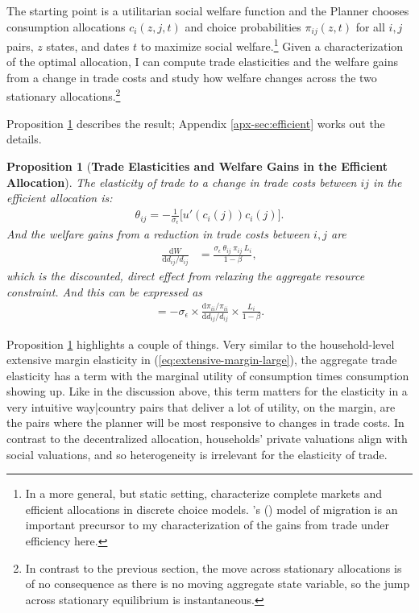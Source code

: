 \documentclass[12pt,pdftex]{article}
\newtheorem{prp}{Proposition}
\def\citeapos#1{\citeauthor{#1}'s (\citeyear{#1})}
\begin{document}
\begin{onehalfspacing}
The starting point is a utilitarian social welfare function and the Planner chooses consumption allocations $c_{i}(z, j, t)$ and choice probabilities $\pi_{ij}(z,t)$ for all $i,j$ pairs, $z$ states, and dates $t$ to maximize social welfare.\footnote{In a more general, but static setting, \citet{mongey-waugh-2} characterize complete markets and efficient allocations in discrete choice models. \citeapos{lagakos2023welfare} model of migration is an important precursor to my characterization of the gains from trade under efficiency here.} Given a characterization of the optimal allocation, I can compute trade elasticities and the welfare gains from a change in trade costs and study how welfare changes across the two stationary allocations.\footnote{In contrast to the previous section, the move across stationary allocations is of no consequence as there is no moving aggregate state variable, so the jump across stationary equilibrium is instantaneous.}

Proposition \ref{prp:gains-efficient-allocation} describes the result; Appendix \ref{apx-sec:efficient} works out the details.

\begin{prp}[\textbf{Trade Elasticities and Welfare Gains in the Efficient Allocation}]\label{prp:gains-efficient-allocation} The elasticity of trade to a change in trade costs between $ij$ in the efficient allocation is:
\begin{align}
\theta_{ij} =  -\frac{1}{\sigma_{\epsilon}} \bigg [ u'(c_{i}(j)) c_{i}(j) \bigg]. \label{eq:eff-trade-elasticity}
\end{align}
And the welfare gains from a reduction in trade costs between $i,j$ are
\begin{align}
\frac{\mathrm{d} W }{\mathrm{d} d_{ij} / d_{ij}} &= \frac{\sigma_{\epsilon} \  \theta_{ij} \  \pi_{ij} \ L_i}{1-\beta},
\label{eq:eff-trade-gains}
\end{align}
which is the discounted, direct effect from relaxing the aggregate resource constraint. And this can be expressed as
\begin{align}
= -\sigma_{\epsilon} \times \frac{\mathrm{d} \pi_{ii} / \pi_{ii}}{\mathrm{d} d_{ij} / d_{ij}} \times \frac{L_i}{1 - \beta}.
\label{eq:eff-trade-gains-acr}
\end{align}
\end{prp}
Proposition \ref{prp:gains-efficient-allocation} highlights a couple of things. Very similar to the household-level extensive margin elasticity in (\ref{eq:extensive-margin-large}), the aggregate trade elasticity has a term with the marginal utility of consumption times consumption showing up. Like in the discussion above, this term matters for the elasticity in a very intuitive way|country pairs that deliver a lot of utility, on the margin, are the pairs where the planner will be most responsive to changes in trade costs. In contrast to the decentralized allocation, households' private valuations align with social valuations, and so heterogeneity is irrelevant for the elasticity of trade.


\end{onehalfspacing}
\end{document}
